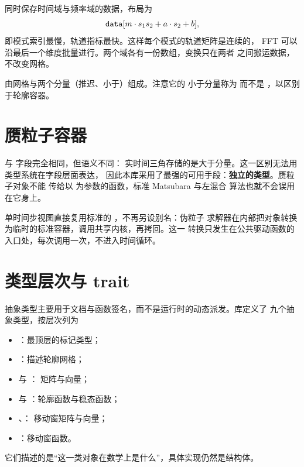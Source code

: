  同时保存时间域与频率域的数据，布局为
\begin{equation}
    \code{data}[m\cdot s_1 s_2 + a\cdot s_2 + b],
\end{equation}
即模式索引最慢，轨道指标最快。这样每个模式的轨道矩阵是连续的，
FFT 可以沿最后一个维度批量进行。两个域各有一份数组，变换只在两者
之间搬运数据，不改变网格。

 由网格与两个分量（推迟、小于）组成。注意它的
小于分量称为  而不是 ，以区别于轮廓容器。

\section{赝粒子容器}
\label{sec:pseudo-containers}

 与  字段完全相同，但语义不同：
实时间三角存储的是大于分量。这一区别无法用类型系统在字段层面表达，
因此本库采用了最强的可用手段：\textbf{独立的类型}。赝粒子对象不能
传给以  为参数的函数，标准 Matsubara 与左混合
算法也就不会误用在它身上。

单时间步视图直接复用标准的 ，不再另设别名：伪粒子
求解器在内部把对象转换为临时的标准容器，调用共享内核，再拷回。这一
转换只发生在公共驱动函数的入口处，每次调用一次，不进入时间循环。

\section{类型层次与 trait}
\label{sec:type-traits}

抽象类型主要用于文档与函数签名，而不是运行时的动态派发。库定义了
九个抽象类型，按层次列为
\begin{itemize}[nosep]
    \item {}：最顶层的标记类型；
    \item {}：描述轮廓网格；
    \item {} 与 ：
          矩阵与向量；
    \item {} 与
          ：轮廓函数与稳态函数；
    \item {}、：
          移动窗矩阵与向量；
    \item {}：移动窗函数。
\end{itemize}
它们描述的是“这一类对象在数学上是什么”，具体实现仍然是结构体。

